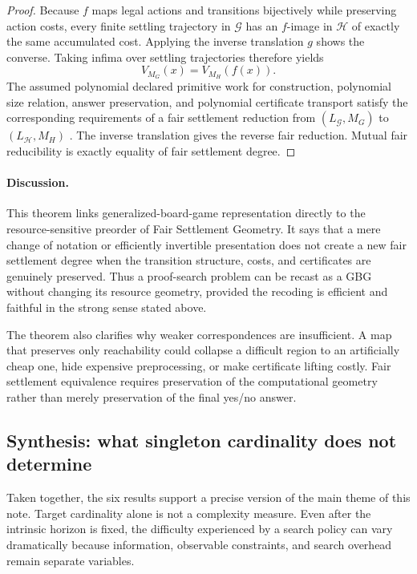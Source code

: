 \documentclass[11pt]{article}
\begin{document}
\begin{proof}
Because $f$ maps legal actions and transitions bijectively while preserving
action costs, every finite settling trajectory in $\mathcal G$ has an
$f$-image in $\mathcal H$ of exactly the same accumulated cost.  Applying the
inverse translation $g$ shows the converse.  Taking infima over settling
trajectories therefore yields
\[
    V_{M_G}(x)=V_{M_H}(f(x)).
\]
The assumed polynomial declared primitive work for construction, polynomial size
relation, answer preservation, and polynomial certificate transport satisfy the
corresponding requirements of a fair settlement reduction from
$(L_{\mathcal G},M_G)$ to $(L_{\mathcal H},M_H)$ \cite{tenneson-fair}.
The inverse translation gives the reverse fair reduction.  Mutual fair
reducibility is exactly equality of fair settlement degree.
\end{proof}

\paragraph{Discussion.}
This theorem links generalized-board-game representation directly to the
resource-sensitive preorder of Fair Settlement Geometry.  It says that a
mere change of notation or efficiently invertible presentation does not create
a new fair settlement degree when the transition structure, costs, and
certificates are genuinely preserved.  Thus a proof-search problem can be
recast as a GBG without changing its resource geometry, provided the recoding
is efficient and faithful in the strong sense stated above.

The theorem also clarifies why weaker correspondences are insufficient.  A map
that preserves only reachability could collapse a difficult region to an
artificially cheap one, hide expensive preprocessing, or make certificate
lifting costly.  Fair settlement equivalence requires preservation of the
computational geometry rather than merely preservation of the final yes/no
answer.

\subsection{Synthesis: what singleton cardinality does not determine}

Taken together, the six results support a precise version of the main theme of
this note.  Target cardinality alone is not a complexity measure.  Even after
the intrinsic horizon is fixed, the difficulty experienced by a search policy
can vary dramatically because information, observable constraints, and search
overhead remain separate variables.
\end{document}
